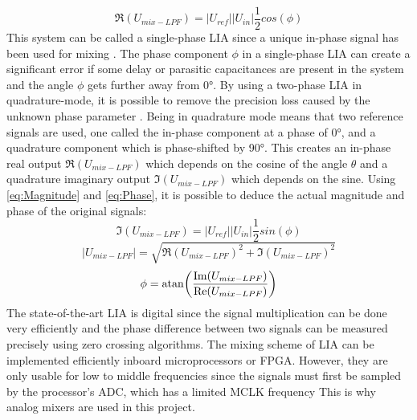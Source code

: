 \begin{equation}
   \Re(U_{mix-LPF}) = \lvert U_{ref} \rvert \lvert U_{in} \rvert \frac{1}{2} cos(\phi)
\end{equation}
This system can be called a single-phase LIA since a unique in-phase signal has been used for mixing \cite{horowitz1989art}. The phase component $\phi$ in a single-phase LIA can create a significant error if some delay or parasitic capacitances are present in the system and the angle $\phi$ gets further away from 0°. By using a two-phase LIA in quadrature-mode, it is possible to remove the precision loss caused by the unknown phase parameter \cite{horowitz1989art}. Being in quadrature mode means that two reference signals are used, one called the in-phase component at a phase of 0°, and a quadrature component which is phase-shifted by 90°. This creates an in-phase real output $\Re(U_{mix-LPF})$ which depends on the cosine of the angle $\theta$ and a quadrature imaginary output $\Im(U_{mix-LPF})$ which depends on the sine. Using \autoref{eq:Magnitude} and \autoref{eq:Phase}, it is possible to deduce the actual magnitude and phase of the original signals: 
\begin{equation}
   \Im(U_{mix-LPF}) = \lvert U_{ref} \rvert \lvert U_{in} \rvert \frac{1}{2} sin(\phi)
\end{equation}
\begin{equation}
   \lvert U_{mix-LPF} \rvert = \sqrt{\Re(U_{mix-LPF})^2 + \Im(U_{mix-LPF})^2}
\end{equation}
\begin{equation}
   \phi = \atan(\frac{\Im(U_{mix-LPF})}{\Re(U_{mix-LPF})})
\end{equation}
The state-of-the-art LIA is digital since the signal multiplication can be done very efficiently and the phase difference between two signals can be measured precisely using zero crossing algorithms. The mixing scheme of LIA can be implemented efficiently inboard microprocessors or FPGA. However, they are only usable for low to middle frequencies since the signals must first be sampled by the processor’s ADC, which has a limited MCLK frequency \cite{horowitz1989art} This is why analog mixers are used in this project.